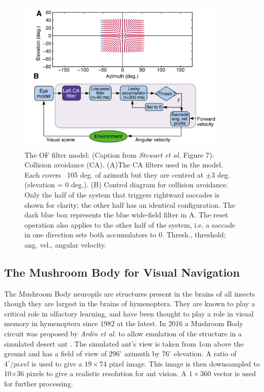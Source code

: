 \documentclass[a4paper,12pt]{article}
\begin{document}
\begin{figure}[h]
 
  \centering
  \includegraphics[width=0.9\textwidth]{Stewart2010CAModel}
  \caption{
    \label{fig:stewartca} The OF filter model: (Caption from \textit{Stewart et al.} Figure 7):
    Collision avoidance (CA). (A)The CA filters used in the
    model. Each covers ~105 deg. of azimuth but they are centred
    at $\pm 3$ deg. (elevation = 0 deg.). (B) Control diagram for collision
    avoidance. Only the half of the system that triggers rightward
    saccades is shown for clarity; the other half has an identical
    configuration. The dark blue box represents the blue wide-field
    filter in A. The reset operation also applies to the other half of
    the system, i.e. a saccade in one direction sets both
    accumulators to 0. Thresh., threshold; ang. vel., angular velocity.
  }
 
\end{figure}

\subsection{ The Mushroom Body for Visual Navigation } \label{MBBackground}
The Mushroom Body neuropils are structures present in the brains of all insects though they are
largest in the brains of hymenoptera. They are known to play a critical role in olfactory
learning, and have been thought to play a role in visual memory in hymenoptera since 1982
at the latest\cite{Mobbs1982}. In 2016 a Mushroom Body circuit was proposed by \textit{Ardin et al.}
to allow emulation of the structure in a simulated desert ant \cite{Ardin2016}. The simulated
ant's view is taken from 1cm above the ground and has a field of view of $296^{\circ}$ azimuth
by $76^{\circ}$ elevation. A ratio of $4^{\circ}/pixel$ is used to give a $19\times74$ pixel image.
This image is then downsampled to 10$\times$36 pixels to give a realistic resolution for ant vision.
A $1\times360$ vector is used for further processing.
\newline
\end{document}
